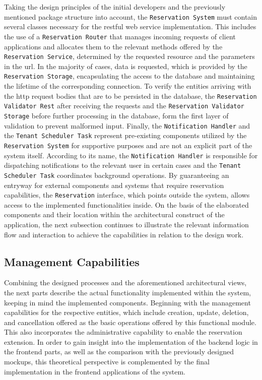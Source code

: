 \noindent Taking the design principles of the initial developers and the previously mentioned package structure into account, the \texttt{Reservation System} must contain several classes necessary for the \acrshort{rest}ful web service implementation.
This includes the use of a \texttt{Reservation Router} that manages incoming requests of client applications and allocates them to the relevant methods offered by the \texttt{Reservation Service}, determined by the requested resource and the parameters in the \acrshort{url}.
In the majority of cases, data is requested, which is provided by the \texttt{Reservation Storage}, encapsulating the access to the database and maintaining the lifetime of the corresponding connection.
To verify the entities arriving with the \acrshort{http} request bodies that are to be persisted in the database, the \texttt{Reservation Validator Rest} after receiving the requests and the \texttt{Reservation Validator Storage} before further processing in the database, form the first layer of validation to prevent malformed input.
Finally, the \texttt{Notification Handler} and the \texttt{Tenant Scheduler Task} represent pre-existing components utilized by the \texttt{Reservation System} for supportive purposes and are not an explicit part of the system itself.
According to its name, the \texttt{Notification Handler} is responsible for dispatching notifications to the relevant user in certain cases and the \texttt{Tenant Scheduler Task} coordinates background operations. 
By guaranteeing an entryway for external components and systems that require reservation capabilities, the \texttt{Reservation} interface, which points outside the system, allows access to the implemented functionalities inside.
On the basis of the elaborated components and their location within the architectural construct of the application, the next subsection continues to illustrate the relevant information flow and interaction to achieve the capabilities in relation to the design work.

\subsection{Management Capabilities}
\label{ch:Implementation:sec:Reservation System:ssec:Management Capabilities}

Combining the designed processes and the aforementioned architectural views, the next parts describe the actual functionality implemented within the system, keeping in mind the implemented components.
Beginning with the management capabilities for the respective entities, which include creation, update, deletion, and cancellation offered as the basic operations offered by this functional module. This also incorporates the administrative capability to enable the reservation extension. 
In order to gain insight into the implementation of the backend logic in the frontend parts, as well as the comparison with the previously designed mockups, this theoretical perspective is complemented by the final implementation in the frontend applications of the system.

